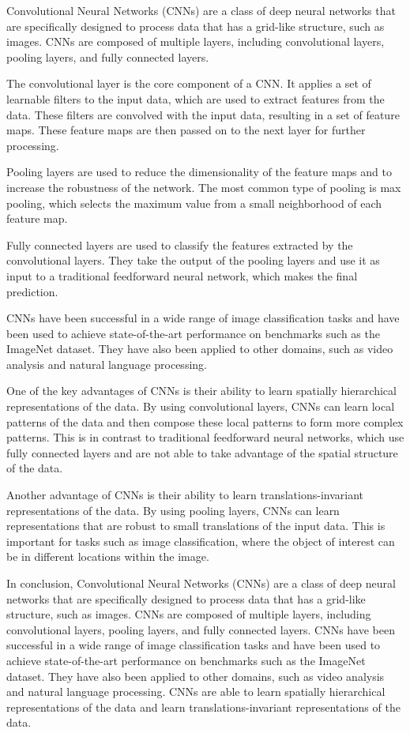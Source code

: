 Convolutional Neural Networks (CNNs) are a class of deep neural networks that are specifically designed to process data that has a grid-like structure, such as images. CNNs are composed of multiple layers, including convolutional layers, pooling layers, and fully connected layers.

The convolutional layer is the core component of a CNN. It applies a set of learnable filters to the input data, which are used to extract features from the data. These filters are convolved with the input data, resulting in a set of feature maps. These feature maps are then passed on to the next layer for further processing.

Pooling layers are used to reduce the dimensionality of the feature maps and to increase the robustness of the network. The most common type of pooling is max pooling, which selects the maximum value from a small neighborhood of each feature map.

Fully connected layers are used to classify the features extracted by the convolutional layers. They take the output of the pooling layers and use it as input to a traditional feedforward neural network, which makes the final prediction.

CNNs have been successful in a wide range of image classification tasks and have been used to achieve state-of-the-art performance on benchmarks such as the ImageNet dataset. They have also been applied to other domains, such as video analysis and natural language processing.

One of the key advantages of CNNs is their ability to learn spatially hierarchical representations of the data. By using convolutional layers, CNNs can learn local patterns of the data and then compose these local patterns to form more complex patterns. This is in contrast to traditional feedforward neural networks, which use fully connected layers and are not able to take advantage of the spatial structure of the data.

Another advantage of CNNs is their ability to learn translations-invariant representations of the data. By using pooling layers, CNNs can learn representations that are robust to small translations of the input data. This is important for tasks such as image classification, where the object of interest can be in different locations within the image.

In conclusion, Convolutional Neural Networks (CNNs) are a class of deep neural networks that are specifically designed to process data that has a grid-like structure, such as images. CNNs are composed of multiple layers, including convolutional layers, pooling layers, and fully connected layers. CNNs have been successful in a wide range of image classification tasks and have been used to achieve state-of-the-art performance on benchmarks such as the ImageNet dataset. They have also been applied to other domains, such as video analysis and natural language processing. CNNs are able to learn spatially hierarchical representations of the data and learn translations-invariant representations of the data.

